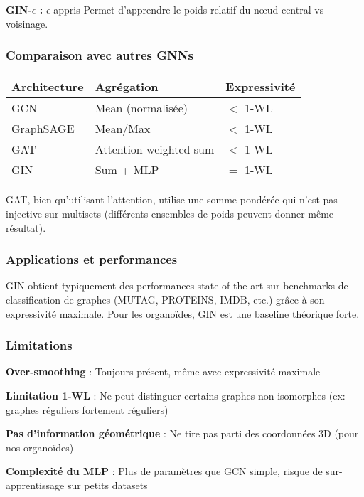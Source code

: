 \textbf{GIN-$\epsilon$ :} $\epsilon$ appris
Permet d'apprendre le poids relatif du nœud central vs voisinage.

\subsubsection{Comparaison avec autres GNNs}

\begin{table}[h]
\centering
\begin{tabular}{lll}
\hline
\textbf{Architecture} & \textbf{Agrégation} & \textbf{Expressivité} \\
\hline
GCN & Mean (normalisée) & $<$ 1-WL \\
GraphSAGE & Mean/Max & $<$ 1-WL \\
GAT & Attention-weighted sum & $<$ 1-WL \\
GIN & Sum + MLP & $=$ 1-WL \\
\hline
\end{tabular}
\end{table}

GAT, bien qu'utilisant l'attention, utilise une somme pondérée qui n'est pas injective sur multisets (différents ensembles de poids peuvent donner même résultat).

\subsubsection{Applications et performances}

GIN obtient typiquement des performances state-of-the-art sur benchmarks de classification de graphes (MUTAG, PROTEINS, IMDB, etc.) grâce à son expressivité maximale. Pour les organoïdes, GIN est une baseline théorique forte.

\subsubsection{Limitations}

\textbf{Over-smoothing} : Toujours présent, même avec expressivité maximale

\textbf{Limitation 1-WL} : Ne peut distinguer certains graphes non-isomorphes (ex: graphes réguliers fortement réguliers)

\textbf{Pas d'information géométrique} : Ne tire pas parti des coordonnées 3D (pour nos organoïdes)

\textbf{Complexité du MLP} : Plus de paramètres que GCN simple, risque de sur-apprentissage sur petits datasets

